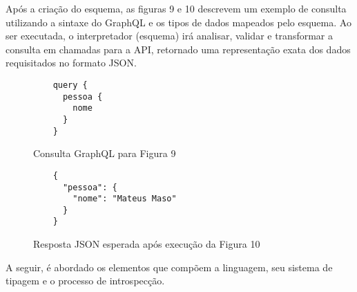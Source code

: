 Após a criação do esquema, as figuras 9 e 10 descrevem um exemplo de consulta utilizando a sintaxe do GraphQL e os tipos de dados mapeados pelo esquema. Ao ser executada, o interpretador (esquema) irá analisar, validar e transformar a consulta em chamadas para a API, retornado uma representação exata dos dados requisitados no formato JSON. \cite{Facebook2016}

\begin{figure}[H]
  \centering
  \begin{verbatim}
    query {
      pessoa {
        nome
      }
    }
  \end{verbatim}
  \caption{Consulta GraphQL para Figura 9}
\end{figure}

\begin{figure}[H]
  \centering
  \begin{verbatim}
    {
      "pessoa": {
        "nome": "Mateus Maso"
      }
    }
  \end{verbatim}
  \caption{Resposta JSON esperada após execução da Figura 10}
\end{figure}

A seguir, é abordado os elementos que compõem a linguagem, seu sistema de tipagem e o processo de introspecção.




